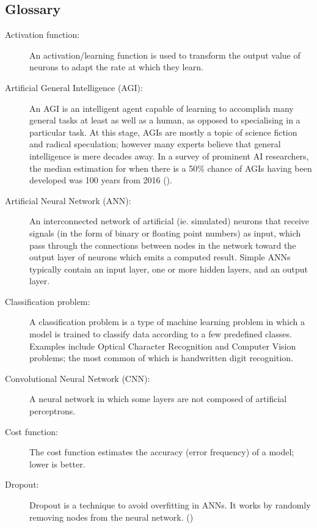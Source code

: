 \documentclass[]{report}
\begin{document}
\twocolumn
\subsection{Glossary}
\begin{description}
\item[Activation function:] An activation/learning function is used to transform the output value of neurons to adapt the rate at which they learn.

\item[Artificial General Intelligence (AGI):] An AGI is an intelligent agent capable of learning to accomplish many general tasks at least as well as a human, as opposed to specialising in a particular task. At this stage, AGIs are mostly a topic of science fiction and radical speculation; however many experts believe that general intelligence is mere decades away. In a survey of prominent AI researchers, the median estimation for when there is a 50\% chance of AGIs having been developed was 100 years from 2016 (\cite{grace2017will}).

\item[Artificial Neural Network (ANN):] An interconnected network of artificial (ie. simulated) neurons that receive signals (in the form of binary or floating point numbers) as input, which pass through the connections between nodes in the network toward the output layer of neurons which emits a computed result. Simple ANNs typically contain an input layer, one or more hidden layers, and an output layer.

\item[Classification problem:] A classification problem is a type of machine learning problem in which a model is trained to classify data according to a few predefined classes. Examples include Optical Character Recognition and Computer Vision problems; the most common of which is handwritten digit recognition.

\item[Convolutional Neural Network (CNN):] A neural network in which some layers are not composed of artificial perceptrons.

\item[Cost function:] The cost function estimates the accuracy (error frequency) of a model; lower is better.

\item[Dropout:] Dropout is a technique to avoid overfitting in ANNs. It works by randomly removing nodes from the neural network. (\cite{dropout14})


\end{description}
\end{document}

